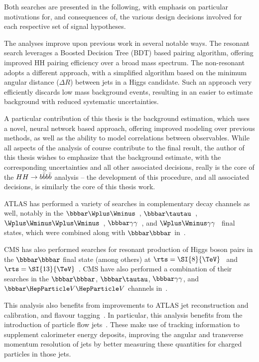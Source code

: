 Both searches are presented in the following, with emphasis on particular motivations for, and consequences
of, the various design decisions involved for each respective set of signal hypotheses. 

The analyses improve upon previous work  in several notable ways. The resonant search leverages 
a Boosted Decision Tree (BDT) based pairing algorithm, offering improved HH pairing efficiency over a broad 
mass spectrum. The non-resonant adopts a different approach, with a simplified algorithm based on the minimum
angular distance ($\Delta R$) between jets in a Higgs candidate. Such an approach very efficiently discards 
low mass background events, resulting in an easier to estimate background with reduced systematic uncertainties.

A particular contribution of this thesis is the background estimation, which uses a novel, neural network
based approach, offering improved modeling over previous methods, as well as the ability to model correlations 
between observables. While all aspects of the analysis of course contribute to the final result, the author of this 
thesis wishes to emphasize that the background estimate, with the corresponding uncertainties and all 
other associated decisions, really is the core of the $HH\rightarrow b\bar{b}b\bar{b}$ analysis -- the development
of this procedure, and all associated decisions, is similarly the core of this thesis work.

ATLAS has performed a variety of searches in complementary decay channels as well,
notably in the $\bbbar\Wplus\Wminus$~\cite{HIGG-2016-27},
$\bbbar\tautau$~\cite{HIGG-2016-16},
$\Wplus\Wminus\Wplus\Wminus$~\cite{HIGG-2016-24},
$\bbbar\gamma\gamma$~\cite{HIGG-2016-15}, and
$\Wplus\Wminus\gamma\gamma$~\cite{HIGG-2016-20} final states, which were combined
along with $\bbbar\bbbar$ in~\cite{HDBS-2018-58}.

CMS has also performed searches for resonant production of Higgs boson pairs in
the $\bbbar\bbbar$ final state (among others) at
$\rts = \SI{8}{\TeV}$~\cite{CMS-EXO-12-053} and
$\rts = \SI{13}{\TeV}$~\cite{CMS-B2G-17-019}. CMS have also performed a
combination of their searches in the $\bbbar\bbbar$, $\bbbar\tautau$,
$\bbbar\gamma\gamma$, and $\bbbar\VVbos$ channels in~\cite{CMS-HIG-17-030}.

This analysis also benefits from improvements to ATLAS jet reconstruction and
calibration, and flavour tagging~\cite{FTAG-2018-01}. In particular, this
analysis benefits from the introduction of particle flow
jets~\cite{PERF-2015-09}. These make use of tracking information to supplement
calorimeter energy deposits, improving the angular and transverse momentum
resolution of jets by better measuring these quantities for charged particles in
those jets.

